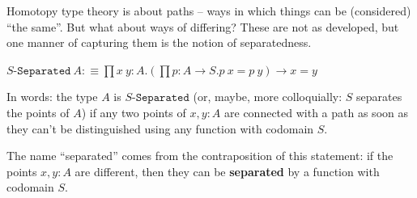 \documentclass[11pt]{article}
\theoremstyle{definition}
\newcommand{\txt}[1]{\texttt{#1}}
\renewcommand{\(}{\left(}
\renewcommand{\)}{\right)}
\newcommand{\defn}{:\equiv}
\newcommand{\apl}[2]{#1\ #2}
\newcommand{\dprod}[2]{\prod #1.#2}
\begin{document}
Homotopy type theory is about paths -- ways in which things can be (considered) ``the same''. But what about ways of differing? These are not as developed, but one manner of capturing them is the notion of separatedness.

\newcommand{\Separated}[1]{#1$-$\txt{Separated}}
$\displaystyle \apl{\Separated{S}}{A} \defn \dprod{x\ y : A}{\(\dprod{p : A \to S}{\apl{p}{x} = \apl{p}{y}}\) \to x = y}$

In words: the type $A$ is $\Separated{S}$ (or, maybe, more colloquially: $S$ separates the points of $A$) if any two points of $x, y : A$ are connected with a path as soon as they can't be distinguished using any function with codomain $S$.

The name ``separated'' comes from the contraposition of this statement: if the points $x, y : A$ are different, then they can be \textbf{separated} by a function with codomain $S$.
\end{document}
